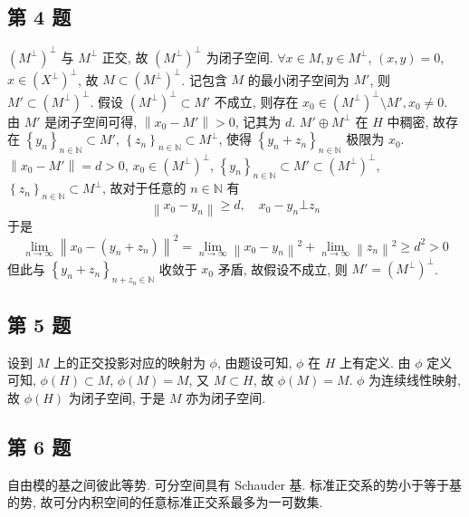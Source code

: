 \documentclass[\ROOT/main.tex]{subfiles}
\begin{document}
\subsection{第 4 题}
$\left( M^\bot \right)^\bot$ 与 $M^\bot$ 正交, 故 $\left( M^\bot \right)^\bot$ 为闭子空间.
$\forall x \in M, y \in M^\bot$, $\left( x, y \right) = 0$, $x \in \left( X^\bot \right)^\bot$, 故 $M \subset \left( M^\bot \right)^\bot$.
记包含 $M$ 的最小闭子空间为 $M'$, 则 $M' \subset \left( M^\bot \right)^\bot$.
假设 $\left( M^\bot \right)^\bot \subset M'$ 不成立, 则存在 $x_0 \in \left( M^\bot \right)^\bot \setminus M', x_0 \neq 0$.
由 $M'$ 是闭子空间可得, $\left\| x_0 - M' \right\| > 0$, 记其为 $d$.
$M' \oplus M^\bot$ 在 $H$ 中稠密, 故存在 $\left\{ y_n \right\}_{n \in \mathbb{N}} \subset M'$, $\left\{ z_n \right\}_{n \in \mathbb{N}} \subset M^\bot$, 使得 $\left\{ y_n + z_n \right\}_{n \in \mathbb{N}}$ 极限为 $x_0$.
$\left\| x_0 - M' \right\| = d > 0$,
$x_0 \in \left( M^\bot \right)^\bot$,
$\left\{ y_n \right\}_{n \in \mathbb{N}} \subset M' \subset \left( M^\bot \right)^\bot$,
$\left\{ z_n \right\}_{n \in \mathbb{N}} \subset M^\bot$,
故对于任意的 $n \in \mathbb{N}$ 有
\[
    \left\| x_0 - y_n \right\| \geqslant d
    , \quad
    x_0 - y_n \bot z_n
\]
于是
\[
    \lim_{n \to \infty} \left\| x_0 - \left( y_n + z_n \right) \right\|^2
    = \lim_{n \to \infty} \left\| x_0 - y_n \right\|^2  + \lim_{n \to \infty} \left\| z_n \right\|^2
    \geqslant d^2
    > 0
\]
但此与 $\left\{ y_n + z_n \right\}_{n + z_n \in \mathbb{N}}$ 收敛于 $x_0$ 矛盾, 故假设不成立, 则 $M' = \left( M^\bot \right)^\bot$.

\subsection{第 5 题}
设到 $M$ 上的正交投影对应的映射为 $\phi$, 由题设可知, $\phi$ 在 $H$ 上有定义.
由 $\phi$ 定义可知, $\phi \left( H \right) \subset M$, $\phi \left( M \right) = M$,
又 $M \subset H$, 故 $\phi \left( M \right) = M$.
$\phi$ 为连续线性映射, 故 $\phi \left( H \right)$ 为闭子空间, 于是 $M$ 亦为闭子空间.

\subsection{第 6 题}
自由模的基之间彼此等势.
可分空间具有 Schauder 基.
标准正交系的势小于等于基的势, 故可分内积空间的任意标准正交系最多为一可数集.
\end{document}
